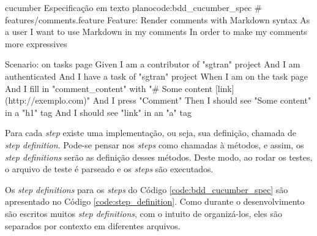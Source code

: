 \begin{mycode}{cucumber}%
{Especificação em texto plano}{code:bdd_cucumber_spec}
# features/comments.feature
Feature: Render comments with Markdown syntax
  As a user
  I want to use Markdown in my comments
  In order to make my comments more expressives

  Scenario: on tasks page
    Given I am a contributor of "sgtran" project
    And I am authenticated
    And I have a task of "sgtran" project
    When I am on the task page
    And I fill in "comment_content" with "# Some content [link](http://exemplo.com)"
    And I press "Comment"
    Then I should see "Some content" in a "h1" tag
    And I should see "link" in an "a" tag
\end{mycode}

Para cada \textit{step} existe uma implementação, ou seja, sua definição, chamada de \textit{step definition}. Pode-se pensar nos \textit{steps} como chamadas à métodos, e assim, os \textit{step definitions} serão as definição desses métodos. Deste modo, ao rodar os testes, o arquivo de teste é parseado e os \textit{steps} são executados.

Os \textit{step definitions} para os \textit{steps} do Código \ref{code:bdd_cucumber_spec} são apresentado no Código \ref{code:step_definition}. Como durante o desenvolvimento são escritos muitos \textit{step definitions}, com o intuito de organizá-los, eles são separados por contexto em diferentes arquivos.


